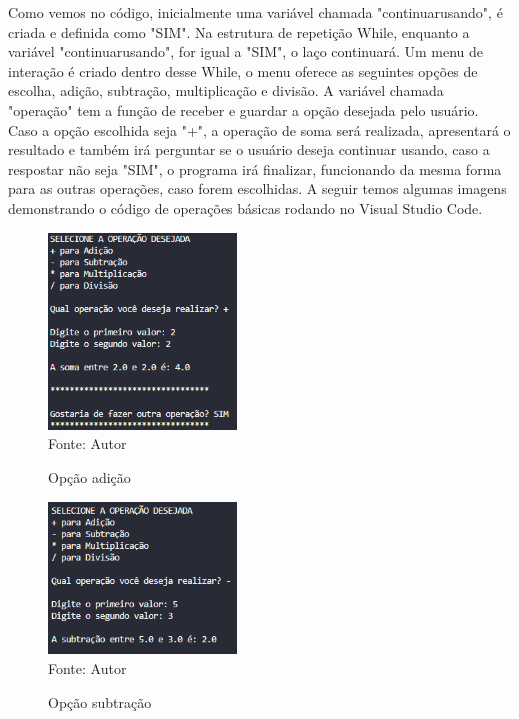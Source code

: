 	Como vemos no código, inicialmente uma variável chamada "continuar\textunderscore usando", é criada e definida como "SIM". Na estrutura de repetição While, enquanto a variável "continuar\textunderscore usando", for igual a "SIM", o laço continuará. Um menu de interação é criado dentro desse While, o menu oferece as seguintes opções de escolha, adição, subtração, multiplicação e divisão. A variável chamada "operação" tem a função de receber e guardar a opção desejada pelo usuário. Caso a opção escolhida seja "+", a operação de soma será realizada, apresentará o resultado e também irá perguntar se o usuário deseja continuar usando, caso a respostar não seja "SIM", o programa irá finalizar, funcionando da mesma forma para as outras operações, caso forem escolhidas. A seguir temos algumas imagens demonstrando o código de operações básicas rodando no Visual Studio Code.

	\begin{figure}[H]
		\begin{center}
			\caption{Opção adição} \label{ling1}
			\includegraphics[width=5cm]{soma.PNG} \\
			{\tiny \sf Fonte:{ Autor}}
		\end{center}
	\end{figure}

	\begin{figure}[H]
		\begin{center}
			\caption{Opção subtração} \label{ling1}
			\includegraphics[width=5cm]{subtracao.PNG} \\
			{\tiny \sf Fonte:{ Autor}}
		\end{center}
	\end{figure}

